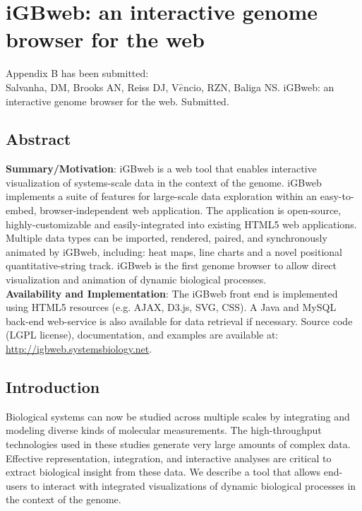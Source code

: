  
\chapter{iGBweb: an interactive genome browser for the web}

\label{appendix:b}

\noindent Appendix B has been submitted:\\

\noindent Salvanha, DM, Brooks AN, Reiss DJ, V$\hat{e}$ncio, RZN, Baliga NS. iGBweb: an interactive genome browser for the web. Submitted.\\

\section{Abstract}

\textbf{Summary/Motivation}: iGBweb is a web tool that enables interactive visualization of systems-scale data in the context of the genome. iGBweb implements a suite of features for large-scale data exploration within an easy-to-embed, browser-independent web application. The application is open-source, highly-customizable and easily-integrated into existing HTML5 web applications. Multiple data types can be imported, rendered, paired, and synchronously animated by iGBweb, including: heat maps, line charts and a novel positional quantitative-string track. iGBweb is the first genome browser to allow direct visualization and animation of dynamic biological processes.\\

\noindent \textbf{Availability and Implementation}: The iGBweb front end is implemented using HTML5 resources (e.g. AJAX, D3.js, SVG, CSS). A Java and MySQL back-end web-service is also available for data retrieval if necessary. Source code (LGPL license), documentation, and examples are available at: \href{http://igbweb.systemsbiology.net}{http://igbweb.systemsbiology.net}.

\section{Introduction}

Biological systems can now be studied across multiple scales by integrating and modeling diverse kinds of molecular measurements. The high-throughput technologies used in these studies generate very large amounts of complex data. Effective representation, integration, and interactive analyses are critical to extract biological insight from these data. We describe a tool that allows end-users to interact with integrated visualizations of dynamic biological processes in the context of the genome. 

